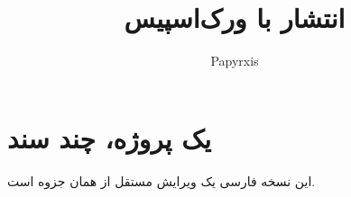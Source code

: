 \documentclass[11pt]{article}
\title{انتشار با ورک‌اسپیس}
\author{Papyrxis}
\begin{document}
\maketitle
\section{یک پروژه، چند سند}
این نسخه فارسی یک ویرایش مستقل از همان جزوه است.
\end{document}
